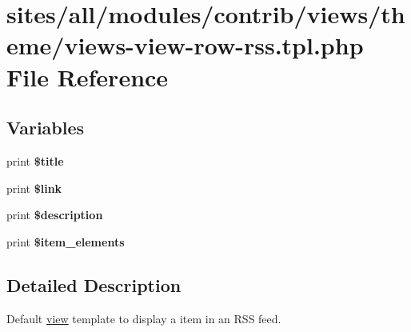 \hypertarget{views-view-row-rss_8tpl_8php}{
\section{sites/all/modules/contrib/views/theme/views-view-row-rss.tpl.php File Reference}
\label{views-view-row-rss_8tpl_8php}
}
\subsection*{Variables}
\begin{CompactItemize}
\item 
\hypertarget{views-view-row-rss_8tpl_8php_ec2795512d255332f57cacd930a090b4}{
print \textbf{\$title}}
\label{views-view-row-rss_8tpl_8php_ec2795512d255332f57cacd930a090b4}

\item 
\hypertarget{views-view-row-rss_8tpl_8php_a6dcf0b94d1bbabe3406acb25a24f3f3}{
print \textbf{\$link}}
\label{views-view-row-rss_8tpl_8php_a6dcf0b94d1bbabe3406acb25a24f3f3}

\item 
\hypertarget{views-view-row-rss_8tpl_8php_6f52c29993b17bf2650a9337fb56d41d}{
print \textbf{\$description}}
\label{views-view-row-rss_8tpl_8php_6f52c29993b17bf2650a9337fb56d41d}

\item 
\hypertarget{views-view-row-rss_8tpl_8php_1335f1f65a2f0a0358b185d5132eb216}{
print \textbf{\$item\_\-elements}}
\label{views-view-row-rss_8tpl_8php_1335f1f65a2f0a0358b185d5132eb216}

\end{CompactItemize}


\subsection{Detailed Description}
Default \hyperlink{classview}{view} template to display a item in an RSS feed. 